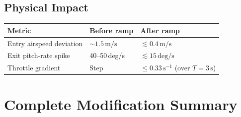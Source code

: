 \documentclass[12pt,a4paper]{article}
\begin{document}
\subsection{Physical Impact}

\begin{center}
\begin{tabular}{lll}
\toprule
Metric & Before ramp & After ramp \\
\midrule
Entry airspeed deviation & $\sim 1.5\,\text{m/s}$ & $\lesssim 0.4\,\text{m/s}$ \\
Exit pitch-rate spike & 40--50\,deg/s & $\lesssim 15\,\text{deg/s}$ \\
Throttle gradient & Step & $\leq 0.33\,\text{s}^{-1}$ (over $T = 3\,\text{s}$) \\
\bottomrule
\end{tabular}
\end{center}

\section{Complete Modification Summary}
\end{document}
